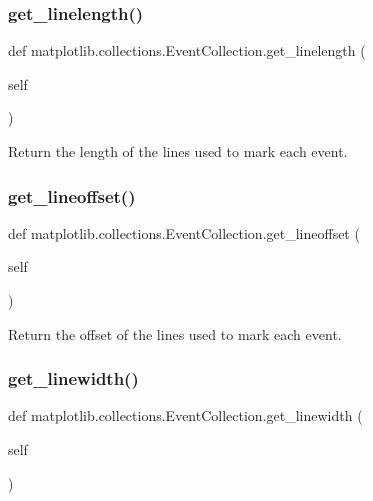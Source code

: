 \subsubsection{\texorpdfstring{get\+\_\+linelength()}{get\_linelength()}}
{\footnotesize\ttfamily def matplotlib.\+collections.\+Event\+Collection.\+get\+\_\+linelength (\begin{DoxyParamCaption}\item[{}]{self }\end{DoxyParamCaption})}

\begin{DoxyVerb}Return the length of the lines used to mark each event.\end{DoxyVerb}
 \mbox{\label{classmatplotlib_1_1collections_1_1EventCollection_af732f0a414876d475616606bb5c9d162}} 
\subsubsection{\texorpdfstring{get\+\_\+lineoffset()}{get\_lineoffset()}}
{\footnotesize\ttfamily def matplotlib.\+collections.\+Event\+Collection.\+get\+\_\+lineoffset (\begin{DoxyParamCaption}\item[{}]{self }\end{DoxyParamCaption})}

\begin{DoxyVerb}Return the offset of the lines used to mark each event.\end{DoxyVerb}
 \mbox{\label{classmatplotlib_1_1collections_1_1EventCollection_a6f985d111085756f0b3868d7aa80c964}} 
\subsubsection{\texorpdfstring{get\+\_\+linewidth()}{get\_linewidth()}}
{\footnotesize\ttfamily def matplotlib.\+collections.\+Event\+Collection.\+get\+\_\+linewidth (\begin{DoxyParamCaption}\item[{}]{self }\end{DoxyParamCaption})}

